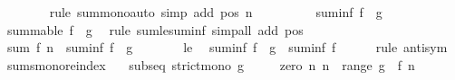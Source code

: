 \begin{isabellebody}
\ \ \ \ \ \ \isamarkupfalse%
\ {\isacharparenleft}{\kern0pt}rule\ sum{\isacharunderscore}{\kern0pt}mono{}{\isacharparenright}{\kern0pt}{\isacharparenleft}{\kern0pt}auto\ simp\ add{\isacharcolon}{\kern0pt}\ pos\ n{\isacharparenright}{\kern0pt}\isanewline
\ \ \ \ \isamarkupfalse%
\ \isamarkupfalse%
\ {\isachardoublequoteopen}{\isasymdots}\ {\isasymle}\ suminf\ {\isacharparenleft}{\kern0pt}f\ {\isasymcirc}\ g{\isacharparenright}{\kern0pt}{\isachardoublequoteclose}\isanewline
\ \ \ \ \ \ \isamarkupfalse%
\ {\isacartoucheopen}summable\ {\isacharparenleft}{\kern0pt}f\ {\isasymcirc}\ g{\isacharparenright}{\kern0pt}{\isacartoucheclose}\ \isamarkupfalse%
\ {\isacharparenleft}{\kern0pt}rule\ sum{\isacharunderscore}{\kern0pt}le{\isacharunderscore}{\kern0pt}suminf{\isacharparenright}{\kern0pt}\ {\isacharparenleft}{\kern0pt}simp{\isacharunderscore}{\kern0pt}all\ add{\isacharcolon}{\kern0pt}\ pos{\isacharparenright}{\kern0pt}\isanewline
\ \ \ \ \isamarkupfalse%
\ \isamarkupfalse%
\ {\isachardoublequoteopen}sum\ f\ {\isacharbraceleft}{\kern0pt}{\isachardot}{\kern0pt}{\isachardot}{\kern0pt}{\isacharless}{\kern0pt}n{\isacharbraceright}{\kern0pt}\ {\isasymle}\ suminf\ {\isacharparenleft}{\kern0pt}f\ {\isasymcirc}\ g{\isacharparenright}{\kern0pt}{\isachardoublequoteclose}\ \isacommand{{\isachardot}{\kern0pt}}\isamarkupfalse%
\isanewline
\ \ \isamarkupfalse%
\isanewline
\ \ \isamarkupfalse%
\ le\ \isamarkupfalse%
\ {\isachardoublequoteopen}suminf\ {\isacharparenleft}{\kern0pt}f\ {\isasymcirc}\ g{\isacharparenright}{\kern0pt}\ {\isacharequal}{\kern0pt}\ suminf\ f{\isachardoublequoteclose}\isanewline
\ \ \ \ \isamarkupfalse%
\ {\isacharparenleft}{\kern0pt}rule\ antisym{\isacharparenright}{\kern0pt}\isanewline
{}\isamarkupfalse%
%
\endisatagproof
{\isafoldproof}%
%
\isadelimproof
\isanewline
%
\endisadelimproof
\isanewline
{}\isamarkupfalse%
\ sums{\isacharunderscore}{\kern0pt}mono{\isacharunderscore}{\kern0pt}reindex{\isacharcolon}{\kern0pt}\isanewline
\ \ \ subseq{\isacharcolon}{\kern0pt}\ {\isachardoublequoteopen}strict{\isacharunderscore}{\kern0pt}mono\ g{\isachardoublequoteclose}\isanewline
\ \ \ \ \ zero{\isacharcolon}{\kern0pt}\ {\isachardoublequoteopen}{\isasymAnd}n{\isachardot}{\kern0pt}\ n\ {\isasymnotin}\ range\ g\ {\isasymLongrightarrow}\ f\ n\ {\isacharequal}{\kern0pt}\ {}{\isachardoublequoteclose}\isanewline

\end{isabellebody}
